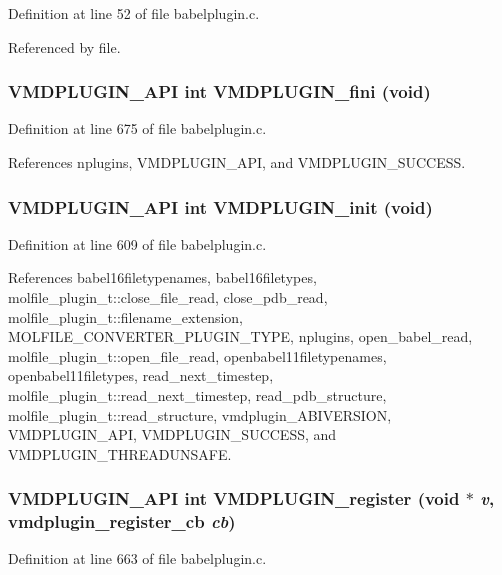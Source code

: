 Definition at line 52 of file babelplugin.c.

Referenced by file.
\subsubsection{\setlength{\rightskip}{0pt plus 5cm}VMDPLUGIN\_\-API int VMDPLUGIN\_\-fini (void)}\label{babelplugin_8c_a20}




Definition at line 675 of file babelplugin.c.

References nplugins, VMDPLUGIN\_\-API, and VMDPLUGIN\_\-SUCCESS.
\subsubsection{\setlength{\rightskip}{0pt plus 5cm}VMDPLUGIN\_\-API int VMDPLUGIN\_\-init (void)}\label{babelplugin_8c_a18}




Definition at line 609 of file babelplugin.c.

References babel16filetypenames, babel16filetypes, molfile\_\-plugin\_\-t::close\_\-file\_\-read, close\_\-pdb\_\-read, molfile\_\-plugin\_\-t::filename\_\-extension, MOLFILE\_\-CONVERTER\_\-PLUGIN\_\-TYPE, nplugins, open\_\-babel\_\-read, molfile\_\-plugin\_\-t::open\_\-file\_\-read, openbabel11filetypenames, openbabel11filetypes, read\_\-next\_\-timestep, molfile\_\-plugin\_\-t::read\_\-next\_\-timestep, read\_\-pdb\_\-structure, molfile\_\-plugin\_\-t::read\_\-structure, vmdplugin\_\-ABIVERSION, VMDPLUGIN\_\-API, VMDPLUGIN\_\-SUCCESS, and VMDPLUGIN\_\-THREADUNSAFE.
\subsubsection{\setlength{\rightskip}{0pt plus 5cm}VMDPLUGIN\_\-API int VMDPLUGIN\_\-register (void $\ast$ {\em v}, {\bf vmdplugin\_\-register\_\-cb} {\em cb})}\label{babelplugin_8c_a19}




Definition at line 663 of file babelplugin.c.

